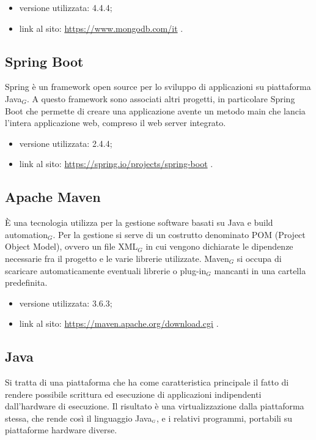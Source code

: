 \begin{itemize}
    \item versione utilizzata: 4.4.4;
    \item link al sito: \url{https://www.mongodb.com/it} .
\end{itemize}

\subsection{Spring Boot} \label{TecnologieSpring}
Spring è un framework open source per lo sviluppo di applicazioni su piattaforma Java$_G$. A  questo framework sono associati altri progetti, in particolare Spring Boot che permette di creare una applicazione avente un metodo main che lancia l'intera applicazione web, compreso il web server integrato.
\begin{itemize}
	\item versione utilizzata: 2.4.4;
	\item link al sito: \url{https://spring.io/projects/spring-boot} .
\end{itemize}

\subsection{Apache Maven}\label{TecnologieMaven}
È una tecnologia utilizza per la gestione software basati su Java e build automation$_G$.
Per la gestione si serve di un costrutto denominato POM (Project Object Model), ovvero un file XML$_G$ in cui vengono dichiarate le dipendenze necessarie fra il progetto e le varie librerie utilizzate.
Maven$_G$ si occupa di scaricare automaticamente eventuali librerie o plug-in$_G$ mancanti in una cartella predefinita.

\begin{itemize}
	\item versione utilizzata: 3.6.3;
	\item link al sito: \url{https://maven.apache.org/download.cgi} .
\end{itemize}

\subsection{Java}\label{TecnologieJava}
Si tratta di una piattaforma che ha come caratteristica principale il fatto di rendere possibile scrittura ed esecuzione di applicazioni indipendenti dall'hardware di esecuzione.
Il risultato è una virtualizzazione dalla piattaforma stessa, che rende così il linguaggio Java$_{\scaleto{G}{3pt}}$, e i relativi programmi, portabili su piattaforme hardware diverse.

